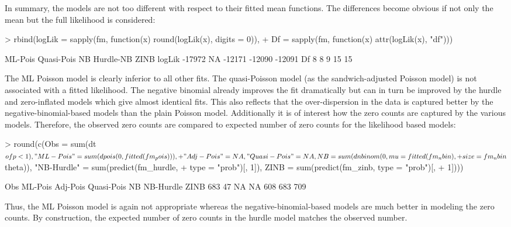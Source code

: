 \documentclass{Z}
\begin{document}
In summary, the models are not too different with respect to their fitted 
mean functions. The differences become obvious if not only the mean but the
full likelihood is considered:
\begin{Schunk}
\begin{Sinput}
> rbind(logLik = sapply(fm, function(x) round(logLik(x), digits = 0)), 
+     Df = sapply(fm, function(x) attr(logLik(x), "df")))
\end{Sinput}
\begin{Soutput}
       ML-Pois Quasi-Pois     NB Hurdle-NB   ZINB
logLik  -17972         NA -12171    -12090 -12091
Df           8          8      9        15     15
\end{Soutput}
\end{Schunk}
The ML Poisson model is clearly inferior to all other fits. The quasi-Poisson
model (as the sandwich-adjusted Poisson model) is not associated with a fitted
likelihood. The negative binomial already improves the fit dramatically but
can in turn be improved by the hurdle and zero-inflated models which give
almost identical fits. This also reflects that the over-dispersion in the data
is captured better by the negative-binomial-based models than the plain
Poisson model. Additionally it is of interest how the zero counts
are captured by the various models. Therefore, the observed zero counts are
compared to expected number of zero counts for the likelihood based models:
\begin{Schunk}
\begin{Sinput}
> round(c(Obs = sum(dt$ofp < 1), "ML-Pois" = sum(dpois(0, fitted(fm_pois))), 
+     "Adj-Pois" = NA, "Quasi-Pois" = NA, NB = sum(dnbinom(0, mu = fitted(fm_nbin), 
+         size = fm_nbin$theta)), "NB-Hurdle" = sum(predict(fm_hurdle, 
+         type = "prob")[, 1]), ZINB = sum(predict(fm_zinb, type = "prob")[, 
+         1])))
\end{Sinput}
\begin{Soutput}
       Obs    ML-Pois   Adj-Pois Quasi-Pois         NB  NB-Hurdle       ZINB 
       683         47         NA         NA        608        683        709 
\end{Soutput}
\end{Schunk}
Thus, the ML Poisson model is again not appropriate whereas the negative-binomial-based
models are much better in modeling the zero counts. By construction, the
expected number of zero counts in the hurdle model matches the observed
number.
\end{document}
